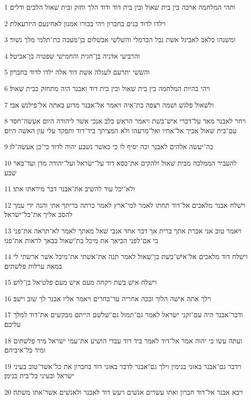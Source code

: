 \par 1 ותהי המלחמה ארכה בין בית שׁאול ובין בית דוד ודוד הלך וחזק ובית שׁאול הלכים ודלים׃
\par 2 וילדו לדוד בנים בחברון ויהי בכורו אמנון לאחינעם היזרעאלת׃
\par 3 ומשׁנהו כלאב לאביגל אשׁת נבל הכרמלי והשׁלשׁי אבשׁלום בן־מעכה בת־תלמי מלך גשׁור׃
\par 4 והרביעי אדניה בן־חגית והחמישׁי שׁפטיה בן־אביטל׃
\par 5 והשׁשׁי יתרעם לעגלה אשׁת דוד אלה ילדו לדוד בחברון׃
\par 6 ויהי בהיות המלחמה בין בית שׁאול ובין בית דוד ואבנר היה מתחזק בבית שׁאול׃
\par 7 ולשׁאול פלגשׁ ושׁמה רצפה בת־איה ויאמר אל־אבנר מדוע באתה אל־פילגשׁ אבי׃
\par 8 ויחר לאבנר מאד על־דברי אישׁ־בשׁת ויאמר הראשׁ כלב אנכי אשׁר ליהודה היום אעשׂה־חסד עם־בית שׁאול אביך אל־אחיו ואל־מרעהו ולא המציתך ביד־דוד ותפקד עלי עון האשׁה היום׃
\par 9 כה־יעשׂה אלהים לאבנר וכה יסיף לו כי כאשׁר נשׁבע יהוה לדוד כי־כן אעשׂה־לו׃
\par 10 להעביר הממלכה מבית שׁאול ולהקים את־כסא דוד על־ישׂראל ועל־יהודה מדן ועד־באר שׁבע׃
\par 11 ולא־יכל עוד להשׁיב את־אבנר דבר מיראתו אתו׃
\par 12 וישׁלח אבנר מלאכים אל־דוד תחתו לאמר למי־ארץ לאמר כרתה בריתך אתי והנה ידי עמך להסב אליך את־כל־ישׂראל׃
\par 13 ויאמר טוב אני אכרת אתך ברית אך דבר אחד אנכי שׁאל מאתך לאמר לא־תראה את־פני כי אם־לפני הביאך את מיכל בת־שׁאול בבאך לראות את־פני׃
\par 14 וישׁלח דוד מלאכים אל־אישׁ־בשׁת בן־שׁאול לאמר תנה את־אשׁתי את־מיכל אשׁר ארשׂתי לי במאה ערלות פלשׁתים׃
\par 15 וישׁלח אישׁ בשׁת ויקחה מעם אישׁ מעם פלטיאל בן־לושׁ׃
\par 16 וילך אתה אישׁה הלוך ובכה אחריה עד־בחרים ויאמר אליו אבנר לך שׁוב וישׁב׃
\par 17 ודבר־אבנר היה עם־זקני ישׂראל לאמר גם־תמול גם־שׁלשׁם הייתם מבקשׁים את־דוד למלך עליכם׃
\par 18 ועתה עשׂו כי יהוה אמר אל־דוד לאמר ביד דוד עבדי הושׁיע את־עמי ישׂראל מיד פלשׁתים ומיד כל־איביהם׃
\par 19 וידבר גם־אבנר באזני בנימין וילך גם־אבנר לדבר באזני דוד בחברון את כל־אשׁר־טוב בעיני ישׂראל ובעיני כל־בית בנימן׃
\par 20 ויבא אבנר אל־דוד חברון ואתו עשׂרים אנשׁים ויעשׂ דוד לאבנר ולאנשׁים אשׁר־אתו משׁתה׃
